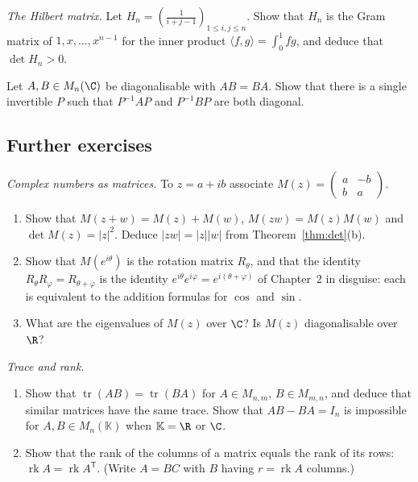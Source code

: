 \begin{exercise}[$\star\star\star$]\label{ex:hilbert}
\emph{The Hilbert matrix.} Let $H_n=\left(\frac1{i+j-1}\right)_{1\le i,j\le n}$. Show that $H_n$ is the Gram matrix of $1,x,\dots,x^{n-1}$ for the inner product
$\langle f,g\rangle=\int_0^1fg$, and deduce that $\det H_n>0$.
\end{exercise}

\begin{exercise}[$\star\star\star$]\label{ex:codiag}
Let $A,B\in M_n(\C)$ be diagonalisable with $AB=BA$. Show that there is a single invertible $P$ such that $P^{-1}AP$ and $P^{-1}BP$ are both diagonal.
\end{exercise}

\subsection*{Further exercises}

\begin{exercise}[$\star$]\label{ex:twobytwo}
\emph{Complex numbers as matrices.} To $z=a+ib$ associate $M(z)=\begin{pmatrix}a&-b\\b&a\end{pmatrix}$.
\begin{enumerate}[label=(\alph*)]
\item Show that $M(z+w)=M(z)+M(w)$, $M(zw)=M(z)M(w)$ and $\det M(z)=|z|^2$. Deduce $|zw|=|z||w|$ from Theorem~\ref{thm:det}(b).
\item Show that $M(e^{i\theta})$ is the rotation matrix $R_\theta$, and that the identity $R_\theta R_\varphi=R_{\theta+\varphi}$ is the identity $e^{i\theta}e^{i\varphi}=e^{i(\theta+\varphi)}$ of Chapter~2 in disguise: each is equivalent to the addition formulas for $\cos$ and $\sin$.
\item What are the eigenvalues of $M(z)$ over $\C$? Is $M(z)$ diagonalisable over $\R$?
\end{enumerate}
\end{exercise}

\begin{exercise}[$\star\star$]\label{ex:tracerank}
\emph{Trace and rank.}
\begin{enumerate}[label=(\alph*)]
\item Show that $\operatorname{tr}(AB)=\operatorname{tr}(BA)$ for $A\in M_{n,m}$, $B\in M_{m,n}$, and deduce that similar matrices have the same trace. Show that $AB-BA=I_n$ is impossible for $A,B\in M_n(\mathbb K)$ when $\mathbb K=\R$ or $\C$.
\item Show that the rank of the columns of a matrix equals the rank of its rows: $\operatorname{rk}A=\operatorname{rk}A^{\mathsf T}$. (Write $A=BC$ with $B$ having $r=\operatorname{rk}A$ columns.)
\end{enumerate}
\end{exercise}

